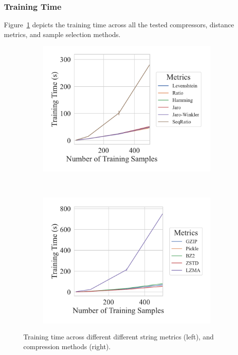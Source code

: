 \subsubsection{Training Time}

Figure~\ref{fig:truthseeker_training_time} depicts the training time across all the tested compressors, distance metrics, and sample selection methods.

\begin{figure}[h!]
    \centering
    \captionsetup[subfigure]{skip=0pt}
	\begin{subfigure}[t]{.44\textwidth}
		\centering
		\includegraphics[width=\textwidth]{figs/truthseeker/string_metric_vs_train_time.pdf}
	\end{subfigure}
	~
	\begin{subfigure}[t]{.44\textwidth}
		\centering
		\includegraphics[width=\textwidth]{figs/truthseeker/compressor_metric_vs_train_time.pdf}
	\end{subfigure}
	\caption{Training time across different different string  metrics (left), and compression methods (right).}
	\label{fig:truthseeker_training_time}
\end{figure}

